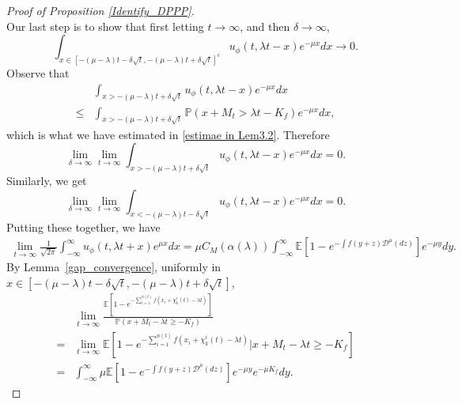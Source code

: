 \documentclass[a4paper,reqno]{amsart}%
\newcommand{\1}{\mathbf 1}
\theoremstyle{mine}
\numberwithin{theorem}{section}
\numberwithin{equation}{section}
\theoremstyle{remark}
\begin{document}
\begin{proof}[Proof of Proposition \ref{Identify_DPPP}]
\begin{equation}
\end{equation}
Our last step is to show that first letting $t\to\infty$, and then $\delta\to\infty$,
\[\int_{x\in [-(\mu - \lambda)t-\delta\sqrt{t},-(\mu -\lambda)t+\delta\sqrt{t}]^c}u_{\phi}(t,\lambda t-x)e^{-\mu x}dx \to 0. \]
Observe that  
\begin{equation}
    \begin{aligned}
    &\int_{x>-(\mu-\lambda)t+\delta\sqrt{t}}u_{\phi}(t,\lambda t-x)e^{-\mu x}dx\\
    \le&\int_{x>-(\mu-\lambda)t+\delta\sqrt{t}}\mathbb{P}(x+ M_{t}>\lambda t -K_{f})e^{-\mu x}dx,
    \end{aligned}
\end{equation}
which is what we have estimated in \eqref{estimae in Lem3.2}. Therefore
\begin{equation}
    \lim_{\delta \to\infty}\lim_{t\to\infty}\int_{x>-(\mu-\lambda)t+\delta\sqrt{t}}u_{\phi}(t,\lambda t-x)e^{-\mu x}dx = 0.
\end{equation}
Similarly, we get
\begin{equation}
    \lim_{\delta \to\infty}\lim_{t\to\infty}\int_{x<-(\mu-\lambda)t-\delta\sqrt{t}}u_{\phi}(t,\lambda t-x)e^{-\mu x}dx = 0.
\end{equation}
Putting these together, we have 
\begin{equation}\label{Eqn_limit F-KPP integral}
  \begin{aligned}
    \lim_{t\to\infty} \frac{1}{\sqrt{2\pi}}\int_{-\infty}^{\infty}u_{\phi}(t,\lambda t+x)e^{\mu x}dx
   =\mu C_{M}(\alpha(\lambda))\int_{-\infty}^{\infty}\mathbb{E}[1-e^{-\int f(y+z)\mathcal{D}^{\mu}(dz) }]e^{-\mu y}dy. 
  \end{aligned}
\end{equation}
By Lemma~\ref{gap_convergence}, uniformly in $x\in[-(\mu -\lambda)t-\delta\sqrt{t},-(\mu -\lambda)t+\delta\sqrt{t}]$, 
\begin{equation}
\begin{aligned}
     &\lim_{t\to\infty}\frac{\mathbb{E}[1-e^{-\sum_{i = 1}^{n(t)} f(x_{i}+\chi_{k}^{i}(t) - \lambda t)}]}{\mathbb{P}(x+M_{t} -\lambda t\ge -K_{f})}\\
     =&\lim_{t\to\infty}\mathbb{E}[1-e^{-\sum_{i = 1}^{n(t)} f(x_{i}+\chi_{k}^{i}(t) - \lambda t)}|x+M_{t} -\lambda t\ge -K_{f}]\\
      =&\int_{-\infty}^{\infty}\mu \mathbb{E}[1-e^{-\int f(y+z)\mathcal{D}^{\mu}(dz) }]e^{-\mu y}e^{-\mu K_{f}}dy.
\end{aligned}
\end{equation}

\end{proof}
\end{document}
